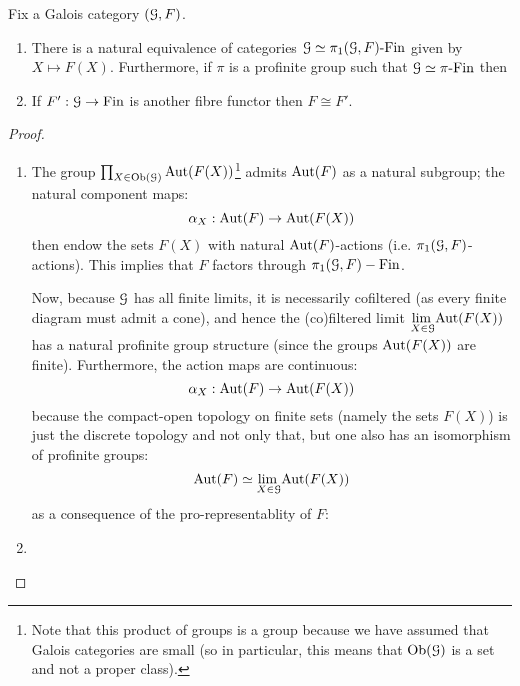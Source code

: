         \begin{proposition} \label{prop: basic_properties_of_galois_categories}
            Fix a Galois category $(\mathcal{G}, F)$.
                \begin{enumerate}
                    \item There is a natural equivalence of categories $\mathcal{G} \simeq \pi_1(\mathcal{G}, F)\text{-}\mathrm{Fin}$ given by $X \mapsto F(X)$. Furthermore, if $\pi$ is a profinite group such that $\mathcal{G} \simeq \pi\text{-}\mathrm{Fin}$ then 
                    \item If $F': \mathcal{G} \to \mathrm{Fin}$ is another fibre functor then $F \cong F'$.
                \end{enumerate}
        \end{proposition}
            \begin{proof}
                \noindent
                \begin{enumerate}
                    \item The group $\prod_{X \in \mathrm{Ob}(\mathcal{G})} \mathrm{Aut}(F(X))$\footnote{Note that this product of groups is a group because we have assumed that Galois categories are small (so in particular, this means that $\mathrm{Ob}(\mathcal{G})$ is a set and not a proper class).} admits $\mathrm{Aut}(F)$ as a natural subgroup; the natural component maps:
                        $$\alpha_X: \mathrm{Aut}(F) \to \mathrm{Aut}(F(X))$$
                    then endow the sets $F(X)$ with natural $\mathrm{Aut}(F)$-actions (i.e. $\pi_1(\mathcal{G}, F)$-actions). This implies that $F$ factors through $\pi_1(\mathcal{G}, F)-\mathrm{Fin}$.
                    
                    Now, because $\mathcal{G}$ has all finite limits, it is necessarily cofiltered (as every finite diagram must admit a cone), and hence the (co)filtered limit $\underset{X \in \mathcal{G}}{\operatorname{lim} \:} \mathrm{Aut}(F(X))$ has a natural profinite group structure (since the groups $\mathrm{Aut}(F(X))$ are finite). Furthermore, the action maps are continuous:
                        $$\alpha_X: \mathrm{Aut}(F) \to \mathrm{Aut}(F(X))$$
                    because the compact-open topology on finite sets (namely the sets $F(X)$) is just the discrete topology and not only that, but one also has an isomorphism of profinite groups:
                        $$\mathrm{Aut}(F) \simeq \underset{X \in \mathcal{G}}{\operatorname{lim} \:} \mathrm{Aut}(F(X))$$
                    as a consequence of the pro-representablity of $F$:  
                    \item 
                \end{enumerate}
            \end{proof}
        
